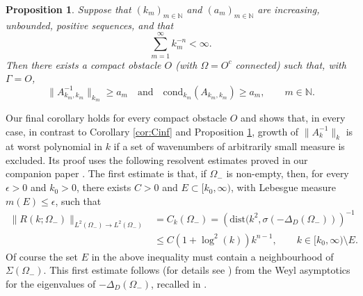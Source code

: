 \documentclass{birkjour}
\newtheorem{proposition}[theorem]{Proposition}
\theoremstyle{definition}
\theoremstyle{remark}
\numberwithin{equation}{section}
\newcommand{\N}{\mathbb{N}}
\newcommand{\cond}{\mathrm{cond}}
\newcommand{\dist}{\mathrm{dist}}
\begin{document}
\begin{proposition} \label{prop:lower}
Suppose that  $(k_m)_{m\in \N}$ and $(a_m)_{m\in \N}$ are increasing, unbounded, positive sequences, and that
\begin{equation} \label{eq:kconstraint}
\sum_{m=1}^\infty k^{-n}_m <\infty.
\end{equation}
Then there exists a compact obstacle $O$ (with $\Omega=O^c$ connected) such that, with $\Gamma=O$,
$$
\|A_{k_m,k_m}^{-1}\|_{k_m} \geq a_m \quad \mbox{and} \quad \cond_{k_m}(A_{k_m,k_m}) \geq a_m, \qquad m\in \N.
$$
\end{proposition}

Our final corollary holds for every compact obstacle $O$ and shows that, in every case, in contrast to Corollary \ref{cor:Cinf} and Proposition \ref{prop:lower}, growth of $\|A_k^{-1}\|_k$ is at worst polynomial in $k$ if a set of wavenumbers of arbitrarily small measure is excluded. Its proof uses the following resolvent estimates proved in our companion paper \cite{SiavashSimon1}. The first estimate  is that, if $\Omega_-$ is non-empty, then, for every $\epsilon>0$ and $k_0>0$, there exists $C>0$ and $E\subset [k_0,\infty)$, with Lebesgue measure $m(E)\leq \epsilon$, such that
\begin{align} \nonumber
\|R(k;\Omega_-)\|_{L^2(\Omega_-)\to L^2(\Omega_-)}&= C_k(\Omega_-)= \left(\dist(k^2,\sigma(-\Delta_D(\Omega_-))\right)^{-1}\\ \label{eq:bounds1}
&\leq C(1+\log^2(k))k^{n-1}, \qquad k\in [k_0,\infty)\setminus E.
\end{align}
Of course the set $E$ in the above inequality must contain a neighbourhood of $\Sigma(\Omega_-)$. This first estimate follows (for details see \cite{SiavashSimon1}) from the Weyl asymptotics for the eigenvalues of $-\Delta_D(\Omega_-)$, recalled in \cite[Thm.~3.3.1, Eqn.~(3.3.4)]{levitin2023topics}.
\end{document}
